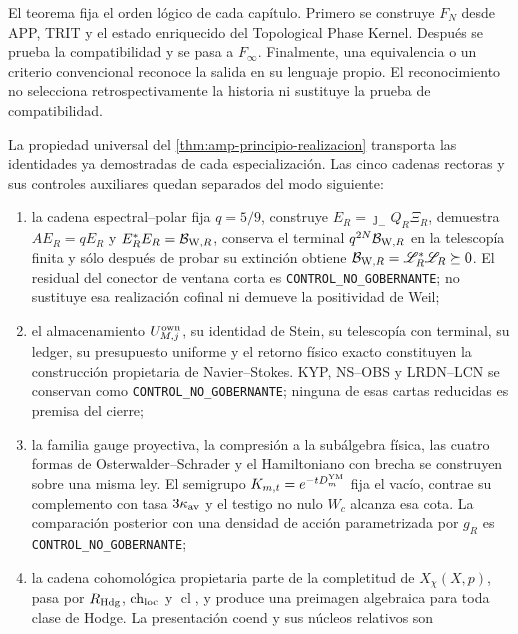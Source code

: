El teorema fija el orden lógico de cada capítulo. Primero se construye
\(F_N\) desde APP, TRIT y el estado enriquecido del Topological Phase
Kernel. Después se prueba la compatibilidad y se pasa a \(F_\infty\).
Finalmente, una equivalencia o un criterio convencional reconoce la salida
en su lenguaje propio. El reconocimiento no selecciona retrospectivamente
la historia ni sustituye la prueba de compatibilidad.

\begin{proposition}
\label{prop:amp-alcance-cinco-realizadores}
La propiedad universal del \cref{thm:amp-principio-realizacion} transporta
las identidades ya demostradas de cada especialización. Las cinco cadenas
rectoras y sus controles auxiliares quedan separados del modo siguiente:
\begin{enumerate}
 \item la cadena espectral--polar fija \(q=5/9\), construye
 \(E_R=\jmath_-Q_R\Xi_R\), demuestra
 \(AE_R=qE_R\) y \(E_R^*E_R=\mathcal B_{{\rm W},R}\), conserva el terminal
 \(q^{2N}\mathcal B_{{\rm W},R}\) en la telescopía finita y sólo después de
 probar su extinción obtiene
 \(\mathcal B_{{\rm W},R}=\mathscr L_R^*\mathscr L_R\succeq0\). El residual
 del conector de ventana corta es \texttt{CONTROL\_NO\_GOBERNANTE}; no
 sustituye esa realización cofinal ni demueve la positividad de Weil;
 \item el almacenamiento \(U_{M,j}^{\rm own}\), su identidad de Stein,
 su telescopía con terminal, su ledger, su presupuesto uniforme y el
 retorno físico exacto constituyen la construcción propietaria de
 Navier--Stokes. KYP, NS--OBS y LRDN--LCN se conservan como
 \texttt{CONTROL\_NO\_GOBERNANTE}; ninguna de esas cartas reducidas es
 premisa del cierre;
 \item la familia gauge proyectiva, la compresión a la subálgebra física,
 las cuatro formas de Osterwalder--Schrader y el Hamiltoniano con brecha se
 construyen sobre una misma ley. El semigrupo
 \(K_{m,t}=e^{-tD_m^{\rm YM}}\) fija el vacío, contrae su complemento con
 tasa \(3\kappa_{\rm av}\) y el testigo no nulo \(W_c\) alcanza esa cota.
 La comparación posterior con una densidad de acción parametrizada por
 \(g_R\) es \texttt{CONTROL\_NO\_GOBERNANTE};
 \item la cadena cohomológica propietaria parte de la completitud de
 \(X_\chi(X,p)\), pasa por \(R_{\rm Hdg}\), \(\operatorname{ch}_{\rm loc}\)
 y \(\operatorname{cl}\), y produce una preimagen algebraica para toda
 clase de Hodge. La presentación coend y sus núcleos relativos son

\end{enumerate}
\end{proposition}
